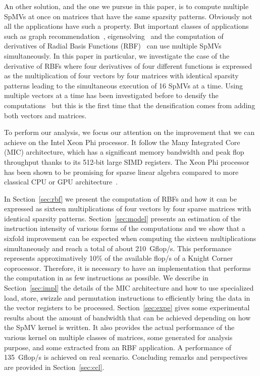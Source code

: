 \documentclass[10pt,conference,compsocconf]{IEEEtran}
\begin{document}
An other solution, and the one we pursue in this paper, is to compute
multiple SpMVs at once on matrices that have the same sparsity
patterns. Obviously not all the applications have such a property. But
important classes of applications such as graph
recommendation~\cite{Kucuktunc13-SNAM}, eigensolving~\cite{LOBPCG} and the computation of
derivatives of Radial Basis Functions (RBF)~\cite{FLBWSC12} can use multiple
SpMVs simultaneously. In this paper in particular, we investigate the
case of the derivative of RBFs where four derivatives of four
different functions is expressed as the multiplication of four vectors
by four matrices with identical sparsity patterns leading to the
simultaneous execution of 16 SpMVs at a time. Using multiple vectors
at a time has been investigated before to densify the
computations~\cite{Im01} but this is the first time that the
densification comes from adding both vectors and matrices.

To perform our analysis, we focus our attention on the improvement
that we can achieve on the Intel Xeon Phi processor. It follow the
Many Integrated Core (MIC) architecture, which has a significant
memory bandwidth and peak flop throughput thanks to its 512-bit large
SIMD registers. The Xeon Phi processor has been shown to be promising
for sparse linear algebra compared to more classical CPU or GPU
architecture~\cite{Saule13-ARXIV, Liu:2013:ESM:2464996.2465013, cramer2012openmp}.

In Section~\ref{sec:rbf} we present the computation of RBFs and how it
can be expressed as sixteen multiplications of four vectors by four sparse matrices
with identical sparsity patterns. Section~\ref{sec:model} presents an
estimation of the instruction intensity of various forms of the
computations and we show that a sixfold improvement can be
expected when computing the sixteen multiplications simultaneously and
reach a total of about 210~Gflop/s. This performance represents
approximatively 10\% of the available flop/s of a Knight Corner
coprocessor. Therefore, it is necessary to have an implementation that
performs the computation in as few instructions as
possible. We describe in Section~\ref{sec:impl} the details of the MIC
architecture and how to use specialized load, store, swizzle and
permutation instructions to efficiently bring the data in the vector
registers to be processed. Section~\ref{sec:expe} gives some
experimental results about the amount of bandwidth that can be achieved
depending on how the SpMV kernel is written. It also provides the actual performance
of the various kernel on multiple classes of matrices, some generated
for analysis purpose, and some extracted from an RBF application. A
performance of 135~Gflop/s is achieved on real scenario. Concluding
remarks and perspectives are provided in Section~\ref{sec:ccl}.
\end{document}
